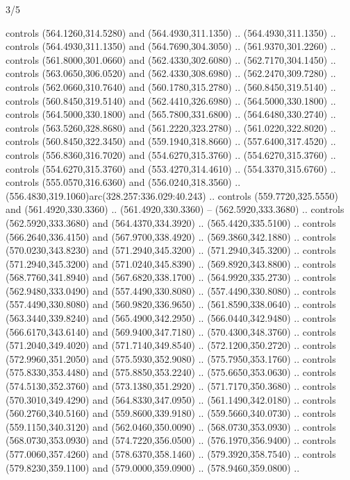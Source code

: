 \begin{flagdescription}{3/5}
\begin{scope}[xshift=0.5\flaglength,yshift=0.5\flagwidth,scale=\flagwidth/602.3]
\begin{scope}[y=0.8pt, x=0.8pt, yscale=-1, shift={(-600,-330)}]
  controls (564.1260,314.5280) and (564.4930,311.1350) .. (564.4930,311.1350) ..
  controls (564.4930,311.1350) and (564.7690,304.3050) .. (561.9370,301.2260) ..
  controls (561.8000,301.0660) and (562.4330,302.6080) .. (562.7170,304.1450) ..
  controls (563.0650,306.0520) and (562.4330,308.6980) .. (562.2470,309.7280) ..
  controls (562.0660,310.7640) and (560.1780,315.2780) .. (560.8450,319.5140) ..
  controls (560.8450,319.5140) and (562.4410,326.6980) .. (564.5000,330.1800) ..
  controls (564.5000,330.1800) and (565.7800,331.6800) .. (564.6480,330.2740) ..
  controls (563.5260,328.8680) and (561.2220,323.2780) .. (561.0220,322.8020) ..
  controls (560.8450,322.3450) and (559.1940,318.8660) .. (557.6400,317.4520) ..
  controls (556.8360,316.7020) and (554.6270,315.3760) .. (554.6270,315.3760) ..
  controls (554.6270,315.3760) and (553.4270,314.4610) .. (554.3370,315.6760) ..
  controls (555.0570,316.6360) and (556.0240,318.3560) ..
  (556.4830,319.1060)arc(328.257:336.029:40.243) .. controls (559.7720,325.5550)
  and (561.4920,330.3360) .. (561.4920,330.3360) -- (562.5920,333.3680) ..
  controls (562.5920,333.3680) and (564.4370,334.3920) .. (565.4420,335.5100) ..
  controls (566.2640,336.4150) and (567.9700,338.4920) .. (569.3860,342.1880) ..
  controls (570.0230,343.8230) and (571.2940,345.3200) .. (571.2940,345.3200) ..
  controls (571.2940,345.3200) and (571.0240,345.8390) .. (569.8920,343.8800) ..
  controls (568.7760,341.8940) and (567.6820,338.1700) .. (564.9920,335.2730) ..
  controls (562.9480,333.0490) and (557.4490,330.8080) .. (557.4490,330.8080) ..
  controls (557.4490,330.8080) and (560.9820,336.9650) .. (561.8590,338.0640) ..
  controls (563.3440,339.8240) and (565.4900,342.2950) .. (566.0440,342.9480) ..
  controls (566.6170,343.6140) and (569.9400,347.7180) .. (570.4300,348.3760) ..
  controls (571.2040,349.4020) and (571.7140,349.8540) .. (572.1200,350.2720) ..
  controls (572.9960,351.2050) and (575.5930,352.9080) .. (575.7950,353.1760) ..
  controls (575.8330,353.4480) and (575.8850,353.2240) .. (575.6650,353.0630) ..
  controls (574.5130,352.3760) and (573.1380,351.2920) .. (571.7170,350.3680) ..
  controls (570.3010,349.4290) and (564.8330,347.0950) .. (561.1490,342.0180) ..
  controls (560.2760,340.5160) and (559.8600,339.9180) .. (559.5660,340.0730) ..
  controls (559.1150,340.3120) and (562.0460,350.0090) .. (568.0730,353.0930) ..
  controls (568.0730,353.0930) and (574.7220,356.0500) .. (576.1970,356.9400) ..
  controls (577.0060,357.4260) and (578.6370,358.1460) .. (579.3920,358.7540) ..
  controls (579.8230,359.1100) and (579.0000,359.0900) .. (578.9460,359.0800) ..

\end{scope}
\end{scope}
\end{flagdescription}
